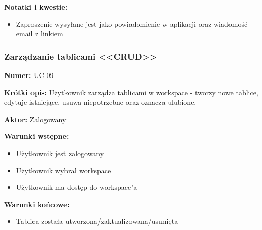 \documentclass[12pt,a4paper]{article}
\begin{document}
\textbf{Notatki i kwestie:} \begin{itemize}
    \item Zaproszenie wysyłane jest jako powiadomienie w aplikacji oraz wiadomość email z linkiem
\end{itemize}

\subsubsection{Zarządzanie tablicami <<CRUD>>}

\textbf{Numer:} UC-09

\textbf{Krótki opis:} Użytkownik zarządza tablicami w workspace - tworzy nowe tablice, edytuje istniejące, usuwa niepotrzebne oraz oznacza ulubione.

\textbf{Aktor:} Zalogowany

\textbf{Warunki wstępne:}
\begin{itemize}[leftmargin=*]
    \item Użytkownik jest zalogowany
    \item Użytkownik wybrał workspace
    \item Użytkownik ma dostęp do workspace'a
\end{itemize}

\textbf{Warunki końcowe:}
\begin{itemize}[leftmargin=*]
    \item Tablica została utworzona/zaktualizowana/usunięta
\end{itemize}
\end{document}
